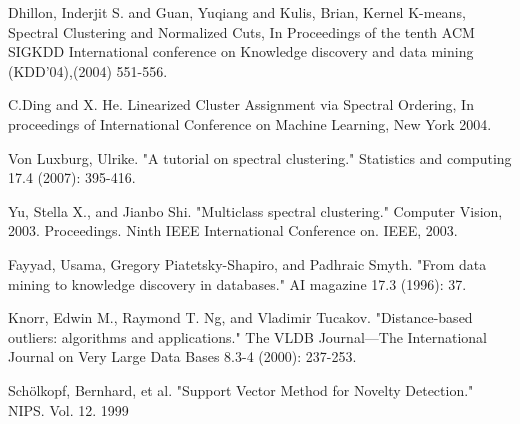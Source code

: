\begin{thebibliography}{9}
Dhillon, Inderjit S. and Guan, Yuqiang and Kulis, Brian, Kernel K-means, Spectral Clustering and Normalized Cuts, In Proceedings of the tenth ACM SIGKDD International conference on Knowledge discovery and data mining (KDD’04),(2004) 551-556.

C.Ding and X. He. Linearized Cluster Assignment via Spectral Ordering, In proceedings of International Conference on Machine Learning, New York 2004.

Von Luxburg, Ulrike. "A tutorial on spectral clustering." Statistics and computing 17.4 (2007): 395-416.

Yu, Stella X., and Jianbo Shi. "Multiclass spectral clustering." Computer Vision, 2003. Proceedings. Ninth IEEE International Conference on. IEEE, 2003.

Fayyad, Usama, Gregory Piatetsky-Shapiro, and Padhraic Smyth. "From data mining to knowledge discovery in databases." AI magazine 17.3 (1996): 37.

Knorr, Edwin M., Raymond T. Ng, and Vladimir Tucakov. "Distance-based outliers: algorithms and applications." The VLDB Journal—The International Journal on Very Large Data Bases 8.3-4 (2000): 237-253.

Schölkopf, Bernhard, et al. "Support Vector Method for Novelty Detection." NIPS. Vol. 12. 1999

\end{thebibliography}
